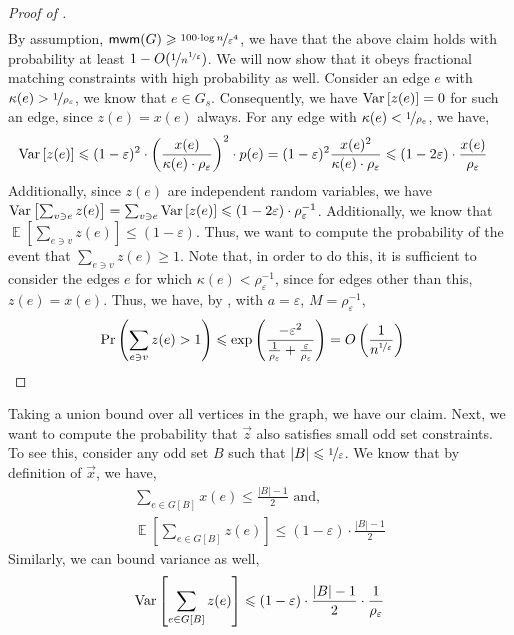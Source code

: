 \documentclass[a4paper,11pt]{article}
\DeclareMathOperator*{\Exp}{\ensuremath{{\mathbb{E}}}}
\DeclareMathOperator*{\Prob}{\ensuremath{\textnormal{Pr}}}
\renewcommand{\Pr}{\Prob}
\newcommand{\prob}[1]{\Pr\paren{#1}}
\newcommand{\card}[1]{|#1|}
\newcommand{\paren}[1]{\left ( #1 \right )}
\newcommand{\bracket}[1]{\left [ #1 \right ]}
\newcommand{\expect}[1]{\Exp\bracket{#1}}
\newcommand{\var}[1]{\textnormal{Var}\bracket{#1}}
\newcommand{\eps}{\varepsilon}
\theoremstyle{definition}
\theoremstyle{definition}
\theoremstyle{definition}
\theoremstyle{definition}
\theoremstyle{definition}
\theoremstyle{definition}
\theoremstyle{definition}
\theoremstyle{definition}
\theoremstyle{definition}
\theoremstyle{definition}
\theoremstyle{definition}
\theoremstyle{definition}
\theoremstyle{definition}
\theoremstyle{definition}
\theoremstyle{definition}
\begin{document}
\begin{proof}[Proof of ]
\begin{align*}
\end{align*}
By assumption, $\textsf{mwm}(G)\geqslant \nicefrac{100\cdot \log n}{\eps^4}$, we have that the above claim holds with probability at least $1-O(\nicefrac{1}{n^{\nicefrac{1}{\eps}}})$. We will now show that it obeys fractional matching constraints with high probability as well. Consider an edge $e$ with $\kappa(e)>\nicefrac{1}{\rho_{\eps}}$, we know that $e\in G_s$. Consequently, we have $\var{z(e)}=0$ for such an edge, since $z(e)=x(e)$ always. For any edge with $\kappa(e)<\nicefrac{1}{\rho_{e}}$, we have,
\begin{align*}
\var{z(e)}&\leqslant (1-\eps)^2\cdot  \paren{\frac{x(e)}{\kappa(e)\cdot \rho_{\eps}}}^2\cdot p(e)= (1-\eps)^2\frac{x(e)^2}{\kappa(e)\cdot \rho_{\eps}}\leqslant (1-2\eps)\cdot \frac{x(e)}{\rho_{\eps}}
\end{align*}
Additionally, since $z(e)$ are independent random variables, we have $\var{\sum_{v\ni e}z(e)}=\sum_{v\ni e} \var{z(e)}\leqslant (1-2\eps)\cdot \rho_{\eps}^{-1}$. Additionally, we know that $\expect{\sum_{e\ni v} z(e)}\leqslant (1-\eps)$. Thus, we want to compute the probability of the event that $\sum_{e\ni v} z(e)\geqslant 1$. Note that, in order to do this, it is sufficient to consider the edges $e$ for which $\kappa(e)<\rho_{\eps}^{-1}$, since for edges other than this, $z(e)=x(e)$. Thus, we have, by , with $a=\eps$, $M=\rho_{\eps}^{-1}$,
\begin{align*}
\prob{\sum_{e\ni v}z(e)>1}&\leqslant \exp\paren{\frac{-\eps^2}{\frac{1}{\rho_{\eps}}+\frac{\eps}{\rho_{\eps}} }}=O\paren{\frac{1}{n^{\nicefrac{1}{\eps}}}}
\end{align*}
\end{proof}
Taking a union bound over all vertices in the graph, we have our claim. Next, we want to compute the probability that $\vec{z}$ also satisfies small odd set constraints. To see this, consider any odd set $B$ such that $\card{B}\leqslant \nicefrac{1}{\eps}$. We know that by definition of $\vec{x}$, we have,
\begin{align*}
\sum_{e\in G[B]} x(e)\leqslant \frac{\card{B}-1}{2} \text{ and,}\\
\expect{\sum_{e\in G[B]}z(e)}\leqslant (1-\eps)\cdot \frac{\card{B}-1}{2}
\end{align*}
Similarly, we can bound variance as well,
\begin{align*}
\var{\sum_{e\in G[B]} z(e)}\leqslant (1-\eps)\cdot \frac{\card{B}-1}{2}\cdot \frac{1}{\rho_{\eps}}
\end{align*}
\end{document}
